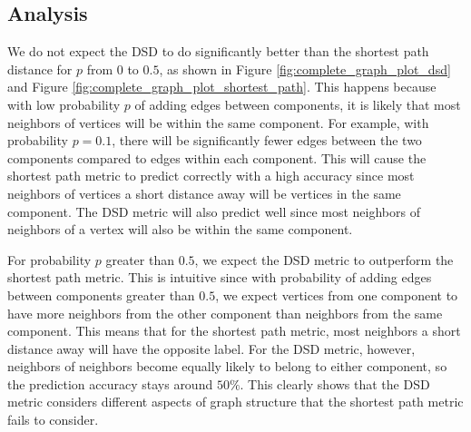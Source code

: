 \subsection{Analysis}
\noindent
We do not expect the DSD to do significantly better than the shortest path distance for $p$ from $0$ to $0.5$, as shown in Figure \ref{fig:complete_graph_plot_dsd} and Figure \ref{fig:complete_graph_plot_shortest_path}. This happens because with low probability $p$ of adding edges between components, it is likely that most neighbors of vertices will be within the same component. For example, with probability $p = 0.1$,  there will be significantly fewer edges between the two components compared to edges within each component. This will cause the shortest path metric to predict correctly with a high accuracy since most neighbors of vertices a short distance away will be vertices in the same component. The DSD metric will also predict well since most neighbors of neighbors of a vertex will also be within the same component.

For probability $p$ greater than $0.5$, we expect the DSD metric to outperform the shortest path metric. This is intuitive since with probability of adding edges between components greater than $0.5$, we expect vertices from one component to have more neighbors from the other component than neighbors from the same component. This means that for the shortest path metric, most neighbors a short distance away will have the opposite label. For the DSD metric, however, neighbors of neighbors become equally likely to belong to either component, so the prediction accuracy stays around $50\%$. This clearly shows that the DSD metric considers different aspects of graph structure that the shortest path metric fails to consider.


